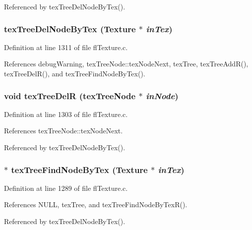 Referenced by tex\-Tree\-Del\-Node\-By\-Tex().
\subsubsection{ tex\-Tree\-Del\-Node\-By\-Tex ({\bf Texture} $\ast$ {\em in\-Tex})}\label{flTexture_8c_529475c7483a05634f0dc7b4bc9d02cb}




Definition at line 1311 of file fl\-Texture.c.

References debug\-Warning, tex\-Tree\-Node::tex\-Node\-Next, tex\-Tree, tex\-Tree\-Add\-R(), tex\-Tree\-Del\-R(), and tex\-Tree\-Find\-Node\-By\-Tex().
\subsubsection{\setlength{\rightskip}{0pt plus 5cm}void tex\-Tree\-Del\-R ({\bf tex\-Tree\-Node} $\ast$ {\em in\-Node})}\label{flTexture_8c_6fbab22bac4735da679083e9ffd6b488}




Definition at line 1303 of file fl\-Texture.c.

References tex\-Tree\-Node::tex\-Node\-Next.

Referenced by tex\-Tree\-Del\-Node\-By\-Tex().
\subsubsection{ $\ast$ tex\-Tree\-Find\-Node\-By\-Tex ({\bf Texture} $\ast$ {\em in\-Tex})}\label{flTexture_8c_d3fb8d6295018388cdebd39ba1de0e7d}




Definition at line 1289 of file fl\-Texture.c.

References NULL, tex\-Tree, and tex\-Tree\-Find\-Node\-By\-Tex\-R().

Referenced by tex\-Tree\-Del\-Node\-By\-Tex().
